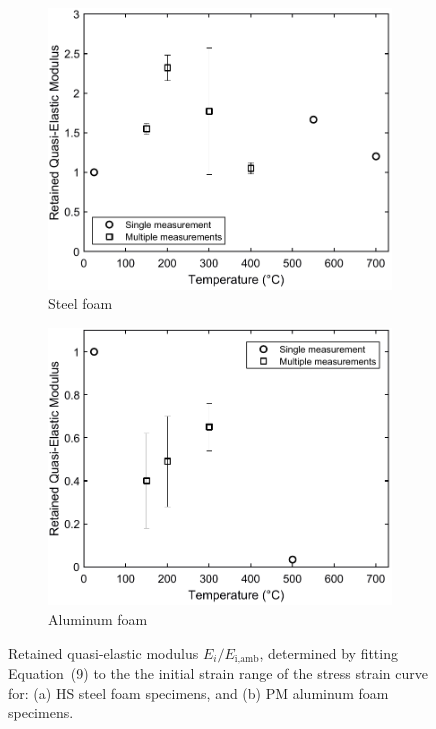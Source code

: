 \documentclass[review]{elsarticle}
\begin{document}
\begin{figure}
	\centering
	\begin{subfigure}{0.50\textwidth}
		\centering
		\includegraphics[width=0.90\linewidth]
		{Tex-Figures/Fig17a-qElast-Fe.pdf}
		\caption{Steel foam}
		\label{fig:Quasi-elast-modulus_Steel}
	\end{subfigure}%
	\begin{subfigure}{0.50\textwidth}
		\centering
		\includegraphics[width=0.90\linewidth]
		{Tex-Figures/Fig17b-qElast-Al.pdf}
		\caption{Aluminum foam}
		\label{fig:Quasi-elast-modulus_Al}
	\end{subfigure}
	\caption{Retained quasi-elastic modulus $E_i/E_\text{i,amb}$, determined by fitting Equation~(9) to the the initial strain range of the stress strain curve for: (a) HS steel foam specimens, and (b) PM aluminum foam specimens.}
	\label{fig:Quasi-elast-modulus}
\end{figure}
\end{document}
